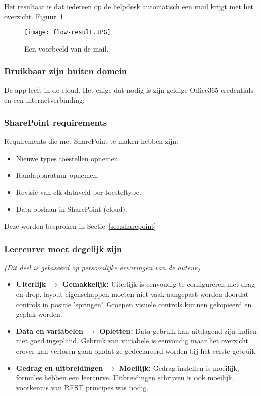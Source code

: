 Het resultaat is dat iedereen op de helpdesk automatisch een mail krijgt met het overzicht. Figuur~\ref{fig:flow-result}

\begin{figure}[h!]
    \texttt{[image: flow-result.JPG]}
    \caption{Een voorbeeld van de mail.}
    \label{fig:flow-result}
\end{figure}


\subsubsection{Bruikbaar zijn buiten domein}

De app leeft in de cloud. Het enige dat nodig is zijn geldige Office365 credentials en een internetverbinding.

\subsubsection{SharePoint requirements}

Requirements die met SharePoint te maken hebben zijn:
\begin{itemize}
    \item Nieuwe types toestellen opnemen.
    \item Randapparatuur opnemen.
    \item Revisie van elk dataveld per toesteltype.
    \item Data opslaan in SharePoint (cloud).
\end{itemize}
Deze worden besproken in Sectie~\ref{sec:sharepoint}

\subsubsection{Leercurve moet degelijk zijn}
\textit{(Dit deel is gebaseerd op persoonlijke ervaringen van de auteur)}

\begin{itemize}
    \item \textbf{Uiterlijk $\rightarrow$ Gemakkelijk:} Uiterlijk is eenvoudig te configureren met drag-en-drop. layout eigenschappen moeten niet vaak aangepast worden doordat controls in positie 'springen'. Groepen visuele controls kunnen gekopieerd en geplak worden.
    \item \textbf{Data en variabelen $\rightarrow$ Opletten:} Data gebruik kan uitdagend zijn indien niet goed ingepland. Gebruik van variabele is eenvoudig maar het overzicht erover kan verloren gaan omdat ze gedeclareerd worden bij het eerste gebruik
    \item \textbf{Gedrag en uitbreidingen $\rightarrow$ Moeilijk:} Gedrag instellen is moeilijk, formules hebben een leercurve. Uitbreidingen schrijven is ook moeilijk, voorkennis van REST principes was nodig.
\end{itemize}

